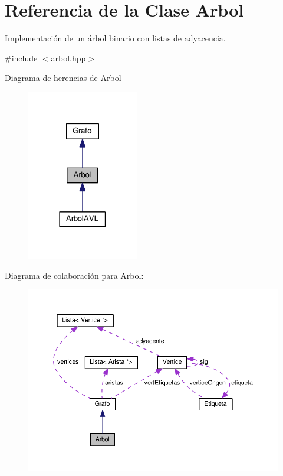 \hypertarget{classArbol}{}\section{Referencia de la Clase Arbol}
\label{classArbol}


Implementación de un árbol binario con listas de adyacencia. ~\newline
  




{\ttfamily \#include $<$arbol.\+hpp$>$}



Diagrama de herencias de Arbol\nopagebreak
\begin{figure}[H]
\begin{center}
\leavevmode
\includegraphics[width=138pt]{classArbol__inherit__graph}
\end{center}
\end{figure}


Diagrama de colaboración para Arbol\+:\nopagebreak
\begin{figure}[H]
\begin{center}
\leavevmode
\includegraphics[width=350pt]{classArbol__coll__graph}
\end{center}
\end{figure}
